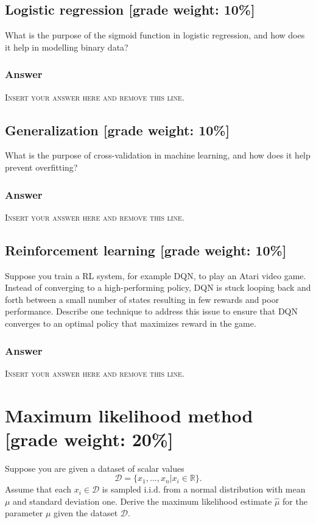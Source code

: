 \documentclass{article}
\begin{document}
\subsection{Logistic regression [grade weight: 10\%]}
What is the purpose of the sigmoid function in logistic regression, and how does it help in modelling binary data?

\subsubsection*{Answer}
\noindent\textsc{Insert your answer here and remove this line.}

\subsection{Generalization [grade weight: 10\%]}
What is the purpose of cross-validation in machine learning, and how does it help prevent overfitting?

\subsubsection*{Answer}
\noindent\textsc{Insert your answer here and remove this line.}

\subsection{Reinforcement learning [grade weight: 10\%]}

Suppose you train a RL system, for example DQN, to play an Atari video game.
Instead of converging to a high-performing policy, DQN is stuck looping back and forth between a small number of states resulting in few rewards and poor performance.
Describe one technique to address this issue to ensure that DQN converges to an optimal policy that maximizes reward in the game.

\subsubsection*{Answer}
\noindent\textsc{Insert your answer here and remove this line.}

\newpage
\section{Maximum likelihood method [grade weight: 20\%]}

Suppose you are given a dataset of scalar values
\begin{equation*}
    \mathcal{D} = \{ x_1,...,x_n | x_i \in \mathbb{R} \}.
\end{equation*}
Assume that each $x_i \in \mathcal{D}$ is sampled i.i.d. from a normal distribution with mean $\mu$ and standard deviation one.
Derive the maximum likelihood estimate $\widehat{\mu}$ for the parameter $\mu$ given the dataset $\mathcal{D}$.
\end{document}
